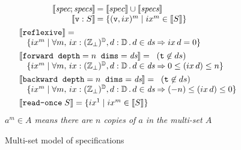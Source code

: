 \documentclass[9pt]{sigplanconf}
\theoremstyle{definition}
\newcommand{\interp}[1]{\llbracket{#1}\rrbracket}
\begin{document}
\begin{figure}
\begin{align*}
\hspace{-2em}
\begin{array}{c}
\hspace{-1em}
\setlength{\arraycolsep}{0.1em}
\begin{array}{rl}
\interp{\textit{spec}; \textit{specs}} & = \interp{spec} \cup
  \interp{\textit{specs}} \\
\interp{\texttt{v} : S} & = \{(\texttt{v}, ix)^m \mid ix^m \in
  \interp{S}\} \\
\end{array}\\[1em]
\begin{array}{ll}
& \interp{\texttt{reflexive}}
  = \\
& \hspace{0.9em}  \{ ix^m \mid \forall m, \, ix : \relix, d : \mathbb{D}
  \, . \, d \in \textit{ds} \Rightarrow ix \, d = 0 \} \\[0.4em]
& \interp{\texttt{forward} \;\; \texttt{depth}=n \;\;
  \texttt{dims}=\textit{ds}}  = \;\; (\texttt{t} \not\in ds) \\
& \hspace{0.9em}  \{ ix^m \mid \forall m, \, ix : \relix, d : \mathbb{D}
  \, . \, d \in \textit{ds} \Rightarrow 0 \leq (ix \, d) \leq n \} \\[0.4em]
& \interp{\texttt{backward} \;\; \texttt{depth}=n \;\; \texttt{dims}=\textit{ds}}
  = \; \; (\texttt{t} \not\in ds) \\
& \hspace{0.9em}  \{ ix^m \mid \forall m, \, ix : \relix, d : \mathbb{D}
  \, . \, d \in \textit{ds} \Rightarrow (-n) \leq (ix \, d) \leq 0 \}
  \\[0.4em]
& \interp{\texttt{read-once} \; S} = \{ ix^1 \mid ix^m \in \interp{S}
  \} 
\end{array}
\end{array}
\end{align*}
\textit{$a^m \in A$ means there are $n$ copies of $a$ in
  the multi-set $A$}
\caption{Multi-set model of specifications}
\label{fig:model}
\end{figure}
\end{document}
